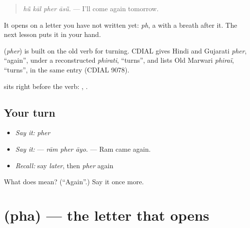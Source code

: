 \begin{quote}
\textbf{   }
\end{quote}

\begin{quote}
\emph{hū̃ kāl pher āsū̃.} — I'll come again tomorrow.
\end{quote}

It opens on a letter you have not written yet: \emph{ph}, a \textbf{} with a breath after it. The next lesson puts it in your hand.

\begin{cousinweb}
\textbf{} (\emph{pher}) is built on the old verb for turning. CDIAL gives Hindi and Gujarati \emph{pher}, \textquotedblleft{}again\textquotedblright{}, under a reconstructed \emph{phirati}, \textquotedblleft{}turns\textquotedblright{}, and lists Old Marwari \emph{phiraï}, \textquotedblleft{}turns\textquotedblright{}, in the same entry (CDIAL 9078).
\end{cousinweb}

\begin{grammarlens}[title={What you've built}]
\textbf{} sits right before the verb: \textbf{ }, \textbf{ }.
\end{grammarlens}

\subsection*{Your turn}
\begin{itemize}
\raggedright
  \item \emph{Say it:} \emph{pher}
  \item \emph{Say it:} \textbf{  } — \emph{rām pher āyo.} — Ram came again.
  \item \emph{Recall:} say \emph{later}, then \emph{pher} again
\end{itemize}

\begin{tcolorbox}[breakable,colback=teal!4,colframe=teal!35!black,title={Before you move on}]
What does \textbf{} mean? (\textquotedblleft{}Again\textquotedblright{}.) Say it once more.
\end{tcolorbox}
\section[\texorpdfstring{\mw{फ} (pha)}{फ (pha)}]{ (pha) — the letter that opens }

